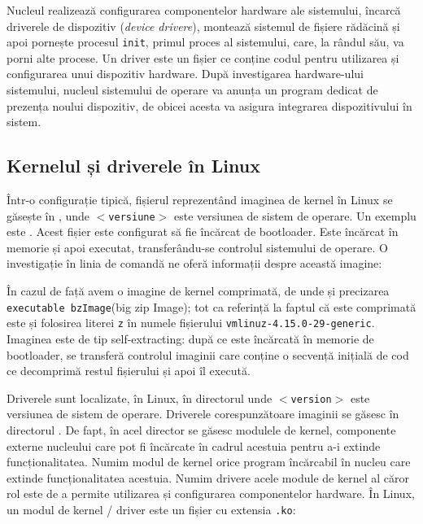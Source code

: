 Nucleul realizează configurarea componentelor hardware ale sistemului, încarcă
driverele de dispozitiv (\textit{device drivere}), montează sistemul de fișiere rădăcină
și apoi pornește procesul \texttt{init}, primul proces al sistemului, care, la rândul său,
va porni alte procese. Un driver este un fișier ce conține codul
pentru utilizarea și configurarea unui dispozitiv hardware. După investigarea
hardware-ului sistemului, nucleul sistemului de operare va anunța un program dedicat
de prezența noului dispozitiv, de obicei acesta va asigura integrarea dispozitivului în sistem.

\subsection{Kernelul și driverele în Linux}
\label{sec:boot:os-linux}

Într-o configurație tipică, fișierul reprezentând imaginea de kernel în Linux se
găsește în , unde \texttt{$<$versiune$>$} este versiunea de sistem de
operare. Un exemplu este . Acest fișier este
configurat să fie încărcat de bootloader. Este încărcat în memorie și apoi
executat, transferându-se controlul sistemului de operare. O investigație în
linia de comandă ne oferă informații despre această imagine:


În cazul de față avem o imagine de kernel comprimată,
de unde și precizarea \texttt{executable bzImage}(big zip Image); tot ca referință la faptul că este
comprimată este și folosirea literei \texttt{z} în numele fișierului
\texttt{vmlinuz-4.15.0-29-generic}. Imaginea este de tip self-extracting: după ce este
încărcată în memorie de bootloader, se transferă controlul imaginii care conține
o secvență inițială de cod ce decomprimă restul fișierului și apoi îl execută.

Driverele sunt localizate, în Linux, în directorul 
unde \texttt{$<$version$>$} este versiunea de sistem de operare. Driverele
corespunzătoare imaginii  se găsesc în directorul
. De fapt, în acel director se
găsesc modulele de kernel, componente externe nucleului care pot fi încărcate în
cadrul acestuia pentru a-i extinde funcționalitatea. Numim modul de kernel orice program
încărcabil în nucleu care extinde funcționalitatea acestuia. Numim drivere acele module de kernel al căror rol este de a permite
utilizarea și configurarea componentelor hardware.  În Linux, un modul de kernel / driver este un fișier cu extensia \texttt{.ko}:

